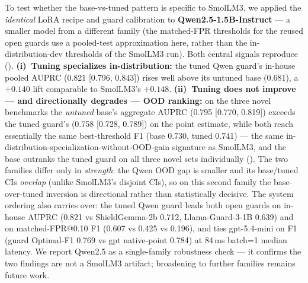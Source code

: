 \documentclass[sigconf,nonacm]{acmart}
\begin{document}
To test whether the base-vs-tuned pattern is specific to SmolLM3, we applied the \emph{identical} LoRA recipe and guard calibration to \textbf{Qwen2.5-1.5B-Instruct} --- a smaller model from a different family (the matched-FPR thresholds for the reused open guards use a pooled-test approximation here, rather than the in-distribution-dev thresholds of the SmolLM3 run). Both central signals reproduce (). \textbf{(i)~Tuning specializes in-distribution:} the tuned Qwen guard's in-house pooled AUPRC (0.821 [0.796, 0.843]) rises well above its untuned base (0.681), a $+0.140$ lift comparable to SmolLM3's $+0.148$. \textbf{(ii)~Tuning does not improve --- and directionally degrades --- OOD ranking:} on the three novel benchmarks the \emph{untuned} base's aggregate AUPRC (0.795 [0.770, 0.819]) exceeds the tuned guard's (0.758 [0.728, 0.789]) on the point estimate, while both reach essentially the same best-threshold F1 (base 0.730, tuned 0.741) --- the same in-distribution-specialization-without-OOD-gain signature as SmolLM3, and the base outranks the tuned guard on all three novel sets individually (). The two families differ only in \emph{strength}: the Qwen OOD gap is smaller and its base/tuned CIs \emph{overlap} (unlike SmolLM3's disjoint CIs), so on this second family the base-over-tuned inversion is directional rather than statistically decisive. The system ordering also carries over: the tuned Qwen guard leads both open guards on in-house AUPRC (0.821 vs ShieldGemma-2b 0.712, Llama-Guard-3-1B 0.639) and on matched-FPR@0.10 F1 (0.607 vs 0.425 vs 0.196), and ties gpt-5.4-mini on F1 (guard Optimal-F1 0.769 vs gpt native-point 0.784) at 84\,ms batch=1 median latency. We report Qwen2.5 as a single-family robustness check --- it confirms the two findings are not a SmolLM3 artifact; broadening to further families remains future work.
\end{document}
